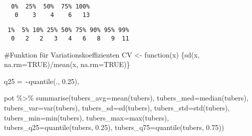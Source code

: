 \documentclass[
  letterpaper,
  DIV=11,
  numbers=noendperiod]{scrartcl}
\newenvironment{Shaded}{\begin{snugshade}}{\end{snugshade}}
\newcommand{\AttributeTok}[1]{\textcolor[rgb]{0.40,0.45,0.13}{#1}}
\newcommand{\CommentTok}[1]{\textcolor[rgb]{0.37,0.37,0.37}{#1}}
\newcommand{\ConstantTok}[1]{\textcolor[rgb]{0.56,0.35,0.01}{#1}}
\newcommand{\ControlFlowTok}[1]{\textcolor[rgb]{0.00,0.23,0.31}{#1}}
\newcommand{\FloatTok}[1]{\textcolor[rgb]{0.68,0.00,0.00}{#1}}
\newcommand{\FunctionTok}[1]{\textcolor[rgb]{0.28,0.35,0.67}{#1}}
\newcommand{\NormalTok}[1]{\textcolor[rgb]{0.00,0.23,0.31}{#1}}
\newcommand{\OtherTok}[1]{\textcolor[rgb]{0.00,0.23,0.31}{#1}}
\newcommand{\SpecialCharTok}[1]{\textcolor[rgb]{0.37,0.37,0.37}{#1}}
\begin{document}
\begin{verbatim}
  0%  25%  50%  75% 100% 
   0    3    4    6   13 
\end{verbatim}

\begin{Shaded}
\end{Shaded}

\begin{verbatim}
 1%  5% 10% 25% 50% 75% 90% 95% 99% 
  0   2   2   3   4   6   8   9  11 
\end{verbatim}

\begin{Shaded}
\begin{Highlighting}[]
\CommentTok{\#Funktion für Variationskoeffizienten}
\NormalTok{CV }\OtherTok{\textless{}{-}} \ControlFlowTok{function}\NormalTok{(x) \{}\FunctionTok{sd}\NormalTok{(x, }\AttributeTok{na.rm=}\ConstantTok{TRUE}\NormalTok{)}\SpecialCharTok{/}\FunctionTok{mean}\NormalTok{(x, }\AttributeTok{na.rm=}\ConstantTok{TRUE}\NormalTok{)\} }
\end{Highlighting}
\end{Shaded}

q25 = \textasciitilde quantile(., 0.25),

\begin{Shaded}
\begin{Highlighting}[]
\NormalTok{pot }\SpecialCharTok{\%\textgreater{}\%} 
  \FunctionTok{summarise}\NormalTok{(}\AttributeTok{tubers\_avg=}\FunctionTok{mean}\NormalTok{(tubers),}
            \AttributeTok{tubers\_med=}\FunctionTok{median}\NormalTok{(tubers),}
            \AttributeTok{tubers\_var=}\FunctionTok{var}\NormalTok{(tubers),}
            \AttributeTok{tubers\_sd=}\FunctionTok{sd}\NormalTok{(tubers),}
            \AttributeTok{tubers\_std=}\FunctionTok{std}\NormalTok{(tubers),}
            \AttributeTok{tubers\_min=}\FunctionTok{min}\NormalTok{(tubers),}
            \AttributeTok{tubers\_max=}\FunctionTok{max}\NormalTok{(tubers),}
            \AttributeTok{tubers\_q25=}\FunctionTok{quantile}\NormalTok{(tubers, }\FloatTok{0.25}\NormalTok{),}
            \AttributeTok{tubers\_q75=}\FunctionTok{quantile}\NormalTok{(tubers, }\FloatTok{0.75}\NormalTok{))}
\end{Highlighting}
\end{Shaded}
\end{document}
